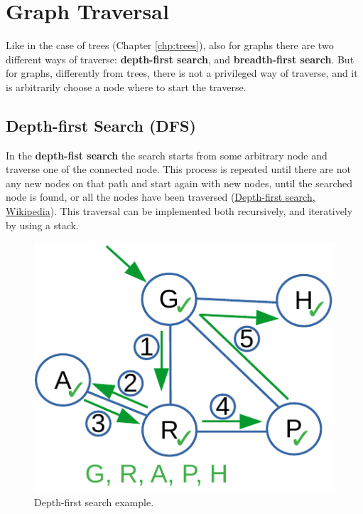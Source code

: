 \section{Graph Traversal}
Like in the case of trees (Chapter \ref{chp:trees}), also for graphs there are two different ways of traverse: \textbf{depth-first search}, and \textbf{breadth-first search}. But for graphs, differently from trees, there is not a privileged way of traverse, and it is arbitrarily choose a node where to start the traverse.

\subsection{Depth-first Search (DFS)}
In the \textbf{depth-fist search} the search starts from some arbitrary node and traverse one of the connected node. This process is repeated until there are not any new nodes on that path and start again with new nodes, until the searched node is found, or all the nodes have been traversed \cite{wikidepthfirst} (\href{https://en.wikipedia.org/wiki/Depth-first_search}{Depth-first search, Wikipedia}). This traversal can be implemented both recursively, and iteratively by using a stack.

\begin{figure}[H]
	\begin{center}
		\includegraphics[scale=.6]{chapters/graphs/images/graphs_6.pdf}
		\caption[Depth-first search example.]{Depth-first search example.}
		\label{graphs_6}
	\end{center}
\end{figure}

